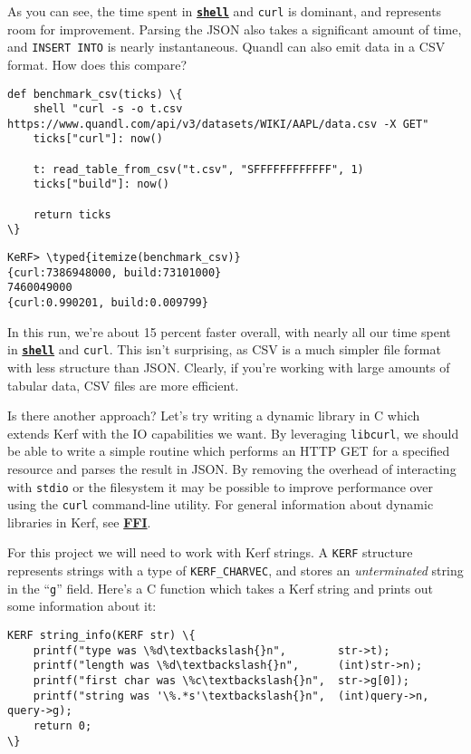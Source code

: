 \documentclass{article}
\newcommand{\typed}[1]{\textcolor{TealBlue}{#1}}
\newcommand{\primu}[2]{\hyperref[prim:#2]{\textbf{\texttt{#1}}}}
\newcommand{\prim}[1]{\primu{#1}{#1}}
\begin{document}
As you can see, the time spent in \prim{shell} and \texttt{curl} is dominant, and represents room for improvement. Parsing the JSON also takes a significant amount of time, and \texttt{INSERT INTO} is nearly instantaneous. Quandl can also emit data in a CSV format. How does this compare?

\begin{Verbatim}
def benchmark_csv(ticks) \{
	shell "curl -s -o t.csv https://www.quandl.com/api/v3/datasets/WIKI/AAPL/data.csv -X GET"
	ticks["curl"]: now()
	
	t: read_table_from_csv("t.csv", "SFFFFFFFFFFFF", 1)
	ticks["build"]: now()
	
	return ticks
\}
\end{Verbatim}
\begin{Verbatim}
KeRF> \typed{itemize(benchmark_csv)}
{curl:7386948000, build:73101000}
7460049000
{curl:0.990201, build:0.009799}
\end{Verbatim}

In this run, we're about 15 percent faster overall, with nearly all our time spent in \prim{shell} and \texttt{curl}. This isn't surprising, as CSV is a much simpler file format with less structure than JSON. Clearly, if you're working with large amounts of tabular data, CSV files are more efficient.

\pagebreak
Is there another approach? Let's try writing a dynamic library in C which extends Kerf with the IO capabilities we want. By leveraging \texttt{libcurl}, we should be able to write a simple routine which performs an HTTP GET for a specified resource and parses the result in JSON. By removing the overhead of interacting with \texttt{stdio} or the filesystem it may be possible to improve performance over using the \texttt{curl} command-line utility. For general information about dynamic libraries in Kerf, see \hyperref[sec:ffi]{\textbf{FFI}}.

\vspace{0.5cm}

For this project we will need to work with Kerf strings. A \texttt{KERF} structure represents strings with a type of \texttt{KERF\_CHARVEC}, and stores an \emph{unterminated} string in the ``\texttt{g}'' field. Here's a C function which takes a Kerf string and prints out some information about it:

\begin{Verbatim}
KERF string_info(KERF str) \{
	printf("type was \%d\textbackslash{}n",        str->t);
	printf("length was \%d\textbackslash{}n",      (int)str->n);
	printf("first char was \%c\textbackslash{}n",  str->g[0]);
	printf("string was '\%.*s'\textbackslash{}n",  (int)query->n, query->g);
	return 0;
\}
\end{Verbatim}
\end{document}
